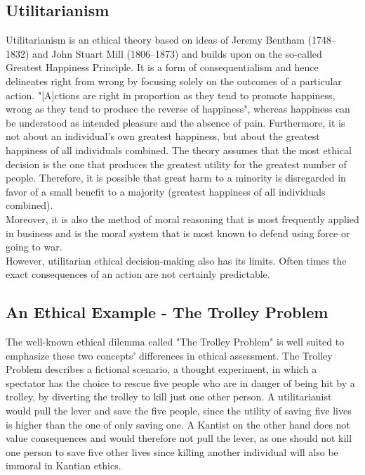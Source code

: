 \documentclass[10pt,twocolumn,twoside]{osajnl}
\begin{document}
\subsection{Utilitarianism}
Utilitarianism is an ethical theory based on ideas of Jeremy Bentham (1748--1832) and John Stuart Mill (1806--1873) and builds upon on the so-called Greatest Happiness Principle.%
It is a form of consequentialism and hence delineates right from wrong by focusing solely on the outcomes of a particular action. 
"[A]ctions are right in proportion as they tend to promote happiness, wrong as they tend to produce the reverse of happiness"\cite{utilitarianism}, whereas happiness can be understood as intended pleasure and the absence of pain.
Furthermore, it is not about an individual's own greatest happiness, but about the greatest happiness of all individuals combined\cite{utilitarianism}. 
The theory assumes that the most ethical decision is the one that produces the greatest utility for the greatest number of people.
Therefore, it is possible that great harm to a minority is disregarded in favor of a small benefit to a majority (greatest happiness of all individuals combined).
\\
Moreover, it is also the method of moral reasoning that is most frequently applied in business \cite{EthicsUnwrapped} and is the moral system that is most known to defend using force or going to war. \\
However, utilitarian ethical decision-making also has its limits. Often times the exact consequences of an action are not certainly predictable.


\subsection{An Ethical Example - The Trolley Problem}
The well-known ethical dilemma called "The Trolley Problem" is well suited to emphasize these two concepts' differences in ethical assessment. 
The Trolley Problem describes a fictional scenario, a thought experiment, in which a spectator has the choice to rescue five people who are in danger of being hit by a trolley, by diverting the trolley to kill just one other person. 
A utilitarianist would pull the lever and save the five people, since the utility of saving five lives is higher than the one of only saving one. A Kantist on the other hand
does not value consequences and would therefore not pull the lever, as one should not kill one person to save five other lives since killing another individual will also be immoral in Kantian ethics. 
\end{document}
